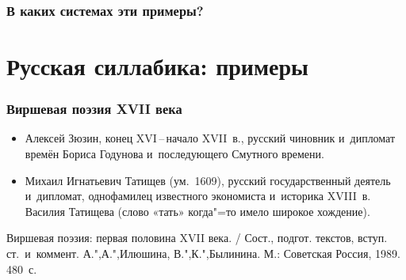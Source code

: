 \documentclass{beamer}
\begin{document}
\begin{frame}
\frametitle{В каких системах эти примеры?}




\end{frame}


\section{Русская силлабика: примеры}\label{sec:syll1}

\begin{frame}
\frametitle{Виршевая поэзия XVII века}
\begin{itemize}
\item Алексей Зюзин, конец XVI\,--\,начало XVII~в., русский чиновник и~дипломат времён Бориса Годунова и~последующего Смутного времени.
\item Михаил Игнатьевич Татищев (ум.~1609), русский государственный деятель и~дипломат, однофамилец известного экономиста и~историка XVIII~в. Василия Татищева (слово «тать» когда"=то имело широкое хождение).
\end{itemize}

{\scriptsize Виршевая поэзия: первая половина XVII века. / Сост., подгот. текстов, вступ. ст.~и~коммент. А.",А.",Илюшина, В.",К.",Былинина. М.: Советская Россия, 1989. 480~с.}
\end{frame}
\end{document}
